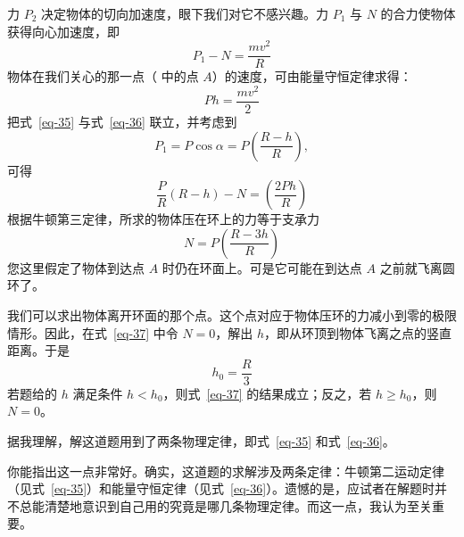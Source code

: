 \begin{dialogue}
\tchr 力 $P_{2}$ 决定物体的切向加速度，眼下我们对它不感兴趣。力 $P_{1}$ 与 $N$ 的合力使物体获得向心加速度，即
\begin{equation}%
P_{1} - N = \frac{mv^{2}}{R}
\label{eq-35}
\end{equation}
物体在我们关心的那一点（ 中的点 $A$）的速度，可由能量守恒定律求得：
\begin{equation}
Ph = \frac{mv^{2}}{2}
\label{eq-36}
\end{equation}
把式~\eqref{eq-35} 与式~\eqref{eq-36} 联立，并考虑到
\begin{equation*}%
P_{1}=P \cos \alpha = P \left(\frac{R-h}{R}\right),
\end{equation*}
可得
\begin{equation*}
\frac{P}{R} \left( R-h \right) - N = \left(\frac{2Ph}{R}\right)
\end{equation*}
根据牛顿第三定律，所求的物体压在环上的力等于支承力
\begin{equation}%
N=P \left( \frac{R-3h}{R} \right)
\label{eq-37}
\end{equation}
\stdb 您这里假定了物体到达点 $A$ 时仍在环面上。可是它可能在到达点 $A$ 之前就飞离圆环了。

\tchr 我们可以求出物体离开环面的那个点。这个点对应于物体压环的力减小到零的极限情形。因此，在式~\eqref{eq-37} 中令 $N=0$，解出 $h$，即从环顶到物体飞离之点的竖直距离。于是
\begin{equation}%
h_{0} = \frac{R}{3}
\label{eq-38}
\end{equation}
若题给的 $h$ 满足条件 $h < h_{0}$，则式~\eqref{eq-37} 的结果成立；反之，若 $h\geqslant h_{0}$，则 $N=0$。

\stda 据我理解，解这道题用到了两条物理定律，即式~\eqref{eq-35} 和式~\eqref{eq-36}。

\tchr 你能指出这一点非常好。确实，这道题的求解涉及两条定律：牛顿第二运动定律（见式~\eqref{eq-35}）和能量守恒定律（见式~\eqref{eq-36}）。遗憾的是，应试者在解题时并不总能清楚地意识到自己用的究竟是哪几条物理定律。而这一点，我认为至关重要。


\end{dialogue}
